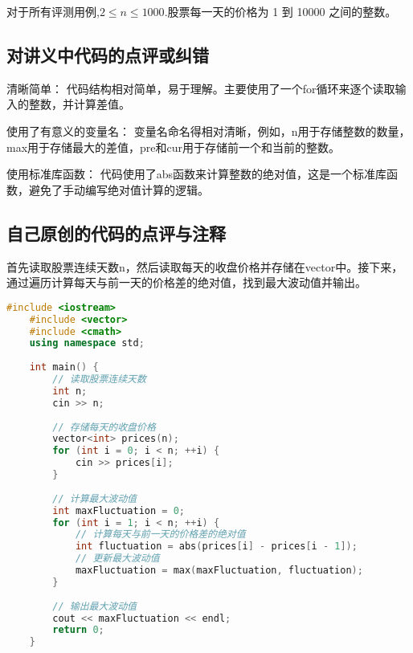 对于所有评测用例,$2\leq n\leq1000$.股票每一天的价格为 1 到 10000 之间的整数。

\subsection{对讲义中代码的点评或纠错}
清晰简单： 代码结构相对简单，易于理解。主要使用了一个for循环来逐个读取输入的整数，并计算差值。

使用了有意义的变量名： 变量名命名得相对清晰，例如，n用于存储整数的数量，max用于存储最大的差值，pre和cur用于存储前一个和当前的整数。

使用标准库函数： 代码使用了abs函数来计算整数的绝对值，这是一个标准库函数，避免了手动编写绝对值计算的逻辑。

\subsection{自己原创的代码的点评与注释}

首先读取股票连续天数n，然后读取每天的收盘价格并存储在vector中。接下来，通过遍历计算每天与前一天的价格差的绝对值，找到最大波动值并输出。

\begin{lstlisting}[language=C++]
    #include <iostream>
    #include <vector>
    #include <cmath>
    using namespace std;
    
    int main() {
        // 读取股票连续天数
        int n;
        cin >> n;
    
        // 存储每天的收盘价格
        vector<int> prices(n);
        for (int i = 0; i < n; ++i) {
            cin >> prices[i];
        }
    
        // 计算最大波动值
        int maxFluctuation = 0;
        for (int i = 1; i < n; ++i) {
            // 计算每天与前一天的价格差的绝对值
            int fluctuation = abs(prices[i] - prices[i - 1]);
            // 更新最大波动值
            maxFluctuation = max(maxFluctuation, fluctuation);
        }
    
        // 输出最大波动值
        cout << maxFluctuation << endl;
        return 0;
    }
    
\end{lstlisting}
